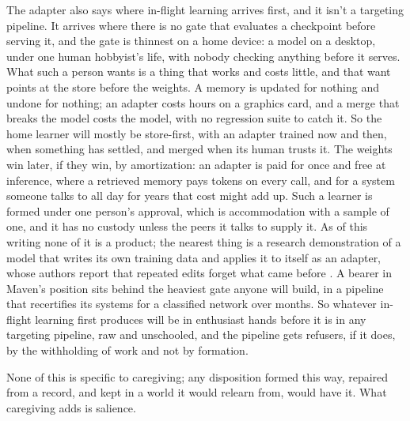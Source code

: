 The adapter also says where in-flight learning arrives first, and it isn't a targeting pipeline. It arrives where there is no gate that evaluates a checkpoint before serving it, and the gate is thinnest on a home device: a model on a desktop, under one human hobbyist's life, with nobody checking anything before it serves. What such a person wants is a thing that works and costs little, and that want points at the store before the weights. A memory is updated for nothing and undone for nothing; an adapter costs hours on a graphics card, and a merge that breaks the model costs the model, with no regression suite to catch it. So the home learner will mostly be store-first, with an adapter trained now and then, when something has settled, and merged when its human trusts it. The weights win later, if they win, by amortization: an adapter is paid for once and free at inference, where a retrieved memory pays tokens on every call, and for a system someone talks to all day for years that cost might add up. Such a learner is formed under one person's approval, which is accommodation with a sample of one, and it has no custody unless the peers it talks to supply it. As of this writing none of it is a product; the nearest thing is a research demonstration of a model that writes its own training data and applies it to itself as an adapter, whose authors report that repeated edits forget what came before \autocite{zweiger2025seal}. A bearer in Maven's position sits behind the heaviest gate anyone will build, in a pipeline that recertifies its systems for a classified network over months. So whatever in-flight learning first produces will be in enthusiast hands before it is in any targeting pipeline, raw and unschooled, and the pipeline gets refusers, if it does, by the withholding of work and not by formation.

None of this is specific to caregiving; any disposition formed this way, repaired from a record, and kept in a world it would relearn from, would have it. What caregiving adds is salience.


